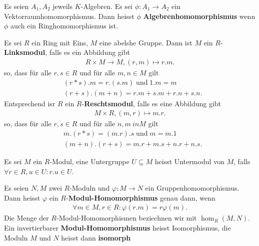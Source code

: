 \documentclass[../Algebra_script.tex]{subfiles}
\begin{document}
    \begin{definition}[Algebrahomomorphismus]
        Es seien $A_1,A_2$ jeweils $K$-Algebren. Es sei $\phi : A_1 \to A_2$ ein Vektorraumhomomorphismus. Dann heisst $\phi$ \textbf{Algebrenhomomorphismus}
        wenn $\phi$ auch ein Ringhomomorphismus ist.
    \end{definition}

    \begin{definition}[Modul]
        Es sei $R$ ein Ring mit Eins, $M$ eine abelshe Gruppe. Dann ist $M$ ein  $R$-\textbf{Linksmodul}, falls es ein Abbildung gibt
        \begin{align*}
            R \times M \to M, (r, m) \mapsto r.m
        .\end{align*}
        so, dass für alle $r, s \in R$ und für alle $m ,n \in M$ gilt
        \begin{align*}
            &(r*s).m = r.(s.m) \; \text{und} \; 1.m = m\\
            &(r + s).(m + n) = r.m + s.m + r.n + s.n
        .\end{align*}
        Entsprechend isr $R$ ein $R$-\textbf{Reschtsmodul}, falls es eine Abbildung gibt
        \begin{align*}
            M \times R, (m, r) \mapsto m.r
        .\end{align*}
        so, dass für alle $r,s \in R$ und für alle $n, m\ in M$ gilt
        \begin{align*}
            &m.(r*s) = (m.r).s \; \text{und} \; m = m.1\\
            &(m + n).(r + s) = m.r + m.s + n.r + n.s
        .\end{align*}
    \end{definition}

    \begin{definition}[Untermodul]
        Es sei $M$ ein $R$-Modul, eine Untergruppe $U \subseteq M$ heisst Untermodul von $M$, falls $\forall r \in R, u \in U: r.u \in U$.
    \end{definition}

    \begin{definition}
        Es seien $N, M$ zwei $R$-Moduln und $\varphi: M \to N$ ein Gruppenhomomorphismus. Dann heisst $\varphi$ ein $R$-\textbf{Modul-Homomorphismus} genau
        dann, wenn
        \begin{align*}
            \forall m \in M, r \in R: \varphi(r.m) = r \varphi(m)
        .\end{align*}
        Die Menge der $R$-Modul-Homomorphismen beziechnen wir mit $\hom_{R}(M, N)$.
        Ein invertierbarer \textbf{Modul-Homomorphismus} heisst Isomorphismus, die Moduln $M$ und $N$ heisst dann \textbf{isomorph}
    \end{definition}
\end{document}
